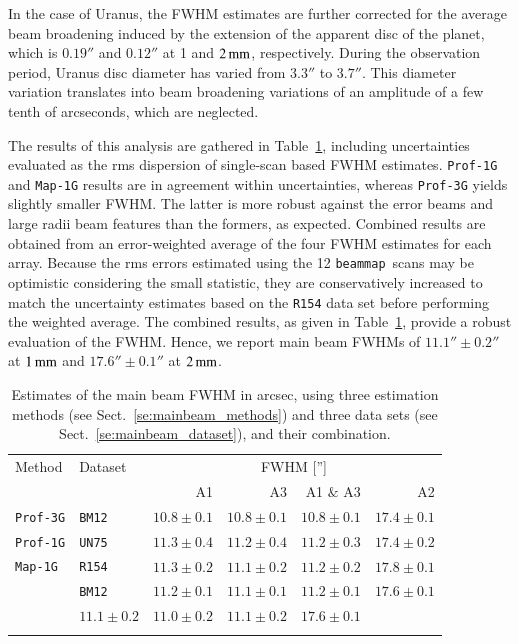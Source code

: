 \documentclass[traditionalabstract]{aa}
\newcommand{\bm}{{\tt beammap}}
\newcommand{\lp}[1]{#1}
\begin{document}
In the case of Uranus, the FWHM estimates are further corrected for
the {\lp average beam broadening induced by the extension of the
apparent disc of the planet, which is $0.19''$ and $0.12''$ at 1 and
$2\,\rm{mm}$, respectively.}
{\lp During the observation period, Uranus disc diameter has varied
from $3.3''$ to $3.7''$. This diameter variation translates into beam
broadening variations of an amplitude of a few tenth of arcseconds,
which are neglected.}  

The results of this analysis are
gathered in Table~\ref{tab:fwhm}, including uncertainties evaluated as
the rms dispersion of single-scan based FWHM estimates.
{\tt Prof-1G} and {\tt Map-1G} results are in agreement within
uncertainties, whereas {\tt Prof-3G} yields slightly smaller FWHM.
{\lp The latter is more robust against the error beams and large radii
beam features than the formers, as expected.}
Combined results are obtained from an error-weighted
average of the four FWHM estimates for each array.
Because the rms errors estimated using the 12 \bm\ scans may be
optimistic considering the small statistic, they are conservatively
increased to match the uncertainty estimates based on the {\tt R154}
data set before performing the weighted average.  
The combined results, as given in
Table~\ref{tab:fwhm}, provide a robust evaluation of the
FWHM. Hence, we report main beam FWHMs of $11.1'' \pm 0.2''$ at
$1\, \rm{mm}$ and $17.6''\pm 0.1''$ at $2\, \rm{mm}$.  

\begin{table}[!thbp]
  \caption[]{Estimates of the main beam FWHM in arcsec, using three estimation methods (see
    Sect.~\ref{se:mainbeam_methods}) and three data sets
    (see Sect.~\ref{se:mainbeam_dataset}), and their combination.}
  \label{tab:fwhm}
  \centering
  \begin{tabular}{llrrrr}
    \hline\hline
    \noalign{\smallskip}
    Method   &    Dataset   &  \multicolumn{4}{c}{FWHM ['']} \\
    \noalign{\smallskip}\cline{3-6}\noalign{\smallskip}
        &    &   A1 &  A3 & A1 $\&$ A3 &  A2  \\
    \noalign{\smallskip}
    \hline
    \noalign{\smallskip}
    {\tt Prof-3G}  &  {\tt BM12}    & $10.8 \pm 0.1$  &  $10.8 \pm 0.1$  & $10.8 \pm 0.1$  &  $17.4 \pm 0.1$  \\
    {\tt Prof-1G}  &  {\tt UN75}    & $11.3 \pm 0.4$  &  $11.2 \pm 0.4$  & $11.2 \pm 0.3$   & $17.4 \pm 0.2$  \\ 
    {\tt Map-1G}   &  {\tt R154}    & $11.3 \pm 0.2$  &  $11.1 \pm 0.2$  & $11.2 \pm 0.2$  &  $17.8 \pm 0.1$  \\ 
                   &  {\tt BM12}    & $11.2 \pm 0.1$  &  $11.1 \pm 0.1$  & $11.2 \pm 0.1$  &  $17.6 \pm 0.1$  \\
    \noalign{\smallskip}
    \hline
    \noalign{\smallskip}
    \multicolumn{2}{c}{Combined}               & $11.1 \pm 0.2$  & $11.0 \pm 0.2$  & $11.1 \pm 0.2$  &  $17.6 \pm 0.1$  \\
    \noalign{\smallskip}
    \hline
  \end{tabular}
\end{table}
\end{document}
